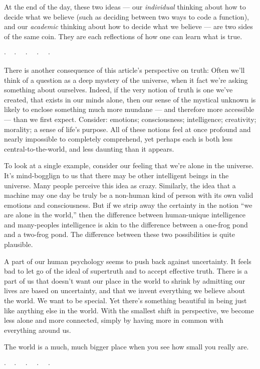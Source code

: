 \documentclass[11pt, oneside]{article}   	%
\newcommand{\dotq}{\cdot\quad}
\newcommand{\scenebreak}{
    \medskip\centerline{$\dotq\dotq\dotq\dotq\cdot$}\medskip
}
\begin{document}
At the end of the day, these two ideas --- our {\em individual}
thinking about how to
decide what we believe (such as deciding between two ways to code a function),
and our {\em academic} thinking about how to decide what we believe --- are two
sides of the same coin. They are each reflections of how one can learn what is
true.

\scenebreak

There is another consequence of this article's perspective on truth:
Often we'll think of a question as a deep mystery of the
universe, when it fact we're asking something about ourselves.
Indeed, if the very notion of truth is one we've created, that exists in our
minds alone, then our sense of the mystical unknown is likely to enclose
something much more mundane --- and therefore more accessible --- than we first
expect.
Consider:
emotions; consciousness; intelligence; creativity; morality; a sense of life's
purpose. All of these notions feel at once profound and nearly impossible to
completely comprehend, yet perhaps each is both less central-to-the-world, and
less daunting than it appears.

To look at a single example, consider our feeling that we're alone in the
universe.
It's mind-bogglign to us that there may be other intelligent beings in the
universe. Many people perceive this idea as crazy.
Similarly, the idea that a machine may one day be truly be a non-human kind of
person with its own valid emotions and consciousness.
But if we strip away the certainty in the notion ``we are alone
in the world,'' then the difference between human-unique intelligence and
many-peoples intelligence is akin to the difference between a one-frog pond
and a two-frog pond. The difference between these two possibilities is quite
plausible.

A part of our human psychology seems to push back against uncertainty. It
feels bad to let go of the ideal of supertruth and to accept effective
truth. There is a part of us that doesn't want our place in the world to
shrink by admitting our lives are based on uncertainty, and that we invent
everything we believe about the world.
We want to be special. Yet there's something beautiful in being just
like anything else in the world. With the smallest shift in perspective,
we become
less alone and more connected, simply by having more in common with everything
around us.

The world is a much, much bigger place when you see how small you really are.

\scenebreak
\end{document}
